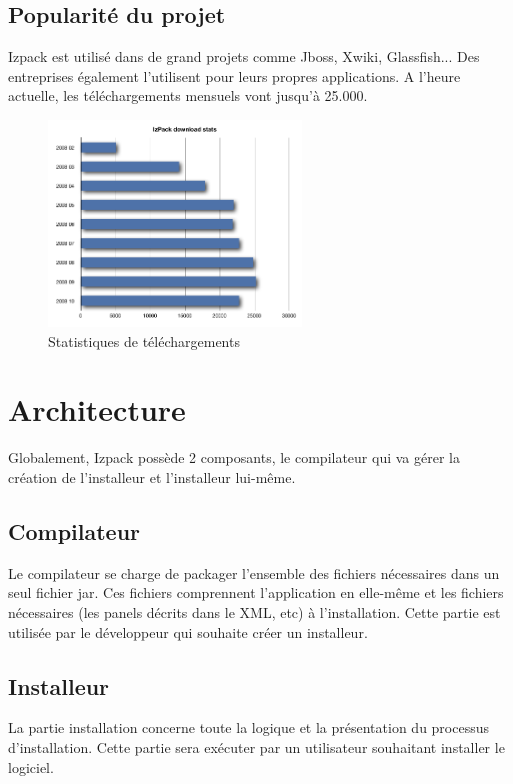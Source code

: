 \subsection{Popularité du projet}
Izpack est utilisé dans de grand projets comme Jboss, Xwiki, Glassfish... Des entreprises également l'utilisent pour leurs propres applications. A l'heure actuelle, les téléchargements mensuels vont jusqu'à 25.000.
\begin{figure}[H]
	\centering
	\includegraphics[width=0.6\textwidth]{../image/telechargements.png}
	\caption{Statistiques de téléchargements}
\end{figure}
\section{Architecture}
Globalement, Izpack possède 2 composants, le compilateur qui va gérer la création de l'installeur et l'installeur lui-même.

\subsection{Compilateur}
Le compilateur se charge de packager l'ensemble des fichiers nécessaires dans un seul fichier jar.
Ces fichiers comprennent l'application en elle-même et les fichiers nécessaires (les panels décrits dans le XML, etc) à l'installation.
Cette partie est utilisée par le développeur qui souhaite créer un installeur.

\subsection{Installeur}
La partie installation concerne toute la logique et la présentation du processus d'installation. Cette partie sera exécuter par un utilisateur souhaitant installer le logiciel.
